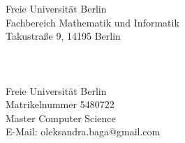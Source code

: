 \begin{titlepage}
	\tgherosfont
	\centering


    {\normalsize Freie Universität Berlin}\\
    {\normalsize Fachbereich Mathematik und Informatik}\\
    {\normalsize Takustraße 9, 14195 Berlin}\\[30mm]
	{\LARGE \color{ctcolortitle}\textbf{\thesisTitle}}\\[20mm]
	{\color{ctcolortitle}\textbf{\thesisTitleEng}}\\[40mm]

	
	{\LARGE \thesisName} \\[5mm]
	    {\normalsize Freie Universität Berlin} \\
    {\normalsize Matrikelnummer 5480722} \\
	{\normalsize Master Computer Science} \\
	{\small E-Mail: oleksandra.baga@gmail.com} \\[20mm]


	\vfill
	
	\hspace*{15pt}
	\begin{minipage}[t]{.65\textwidth}
		\centering
		{\large \thesisFirstReviewer} \\
	  	{\small \thesisFirstReviewerDepartment} \\[-1mm]
		{\small \thesisFirstReviewerUniversity}
			\hspace*{15pt}
	\end{minipage} \\[15mm]

\hspace*{15pt}
\begin{minipage}[t]{.65\textwidth}
	\centering
	{\large \thesisSecondReviewer} \\
	{\small \thesisSecondReviewerDepartment} \\[-1mm]
	{\small \thesisSecondReviewerUniversity}
	
\end{minipage} \\[5mm]

\end{titlepage}